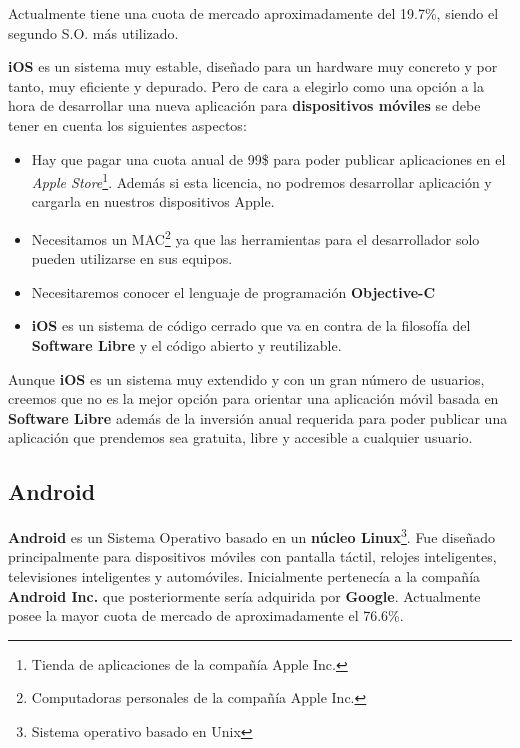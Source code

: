 \bigskip
Actualmente tiene una cuota de mercado aproximadamente del 19.7\%, siendo el segundo S.O. más utilizado.

\bigskip
\textbf{iOS} es un sistema muy estable, diseñado para un hardware muy concreto y por tanto, muy eficiente y depurado. Pero de cara a elegirlo como una opción a la hora de desarrollar una nueva aplicación para \textbf{dispositivos móviles} se debe tener en cuenta los siguientes aspectos:

\begin{itemize}
  \item Hay que pagar una cuota anual de 99\$ para poder publicar aplicaciones en el \textit{Apple Store}\footnote{Tienda de aplicaciones de la compañía Apple Inc.}. Además si esta licencia, no podremos desarrollar aplicación y cargarla en nuestros dispositivos Apple.
  \item Necesitamos un MAC\footnote{Computadoras personales de la compañía Apple Inc.} ya que las herramientas para el desarrollador solo pueden utilizarse en sus equipos.
  \item Necesitaremos conocer el lenguaje de programación \textbf{Objective-C}
  \item \textbf{iOS} es un sistema de código cerrado que va en contra de la filosofía del \textbf{Software Libre} y el código abierto y reutilizable.

\end{itemize}

\bigskip
Aunque \textbf{iOS} es un sistema muy extendido y con un gran número de usuarios, creemos que no es la mejor opción para orientar una aplicación móvil basada en \textbf{Software Libre} además de la inversión anual requerida para poder publicar una aplicación que prendemos sea gratuita, libre y accesible a cualquier usuario.


\subsection{Android}

\textbf{Android} es un Sistema Operativo basado en un \textbf{núcleo Linux}\footnote{Sistema operativo basado en Unix}. Fue diseñado principalmente para dispositivos móviles con pantalla táctil, relojes inteligentes, televisiones inteligentes y automóviles. Inicialmente pertenecía a la compañía \textbf{Android Inc.} que posteriormente sería adquirida por \textbf{Google}. Actualmente posee la mayor cuota de mercado de aproximadamente el 76.6\%.

